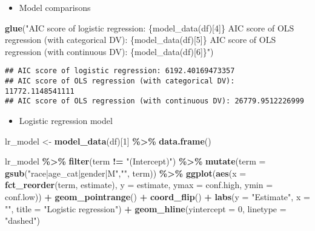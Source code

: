 \documentclass[
]{book}
\newenvironment{Shaded}{\begin{snugshade}}{\end{snugshade}}
\newcommand{\DataTypeTok}[1]{\textcolor[rgb]{0.13,0.29,0.53}{#1}}
\newcommand{\DecValTok}[1]{\textcolor[rgb]{0.00,0.00,0.81}{#1}}
\newcommand{\KeywordTok}[1]{\textcolor[rgb]{0.13,0.29,0.53}{\textbf{#1}}}
\newcommand{\NormalTok}[1]{#1}
\newcommand{\OperatorTok}[1]{\textcolor[rgb]{0.81,0.36,0.00}{\textbf{#1}}}
\newcommand{\StringTok}[1]{\textcolor[rgb]{0.31,0.60,0.02}{#1}}
\providecommand{\tightlist}{%
  \setlength{\itemsep}{0pt}\setlength{\parskip}{0pt}}
\begin{document}
\begin{itemize}
\tightlist
\item
  Model comparisons
\end{itemize}

\begin{Shaded}
\begin{Highlighting}[]
\KeywordTok{glue}\NormalTok{(}\StringTok{"AIC score of logistic regression: \{model\_data(df)[4]\} }
\StringTok{      AIC score of OLS regression (with categorical DV):  \{model\_data(df)[5]\}}
\StringTok{      AIC score of OLS regression (with continuous DV): \{model\_data(df)[6]\}"}\NormalTok{)}
\end{Highlighting}
\end{Shaded}

\begin{verbatim}
## AIC score of logistic regression: 6192.40169473357 
## AIC score of OLS regression (with categorical DV):  11772.1148541111
## AIC score of OLS regression (with continuous DV): 26779.9512226999
\end{verbatim}

\begin{itemize}
\tightlist
\item
  Logistic regression model
\end{itemize}

\begin{Shaded}
\begin{Highlighting}[]
\NormalTok{lr\_model \textless{}{-}}\StringTok{ }\KeywordTok{model\_data}\NormalTok{(df)[}\DecValTok{1}\NormalTok{] }\OperatorTok{\%\textgreater{}\%}\StringTok{ }\KeywordTok{data.frame}\NormalTok{()}

\NormalTok{lr\_model }\OperatorTok{\%\textgreater{}\%}
\StringTok{  }\KeywordTok{filter}\NormalTok{(term }\OperatorTok{!=}\StringTok{ "(Intercept)"}\NormalTok{) }\OperatorTok{\%\textgreater{}\%}
\StringTok{  }\KeywordTok{mutate}\NormalTok{(}\DataTypeTok{term =} \KeywordTok{gsub}\NormalTok{(}\StringTok{"race|age\_cat|gender|M"}\NormalTok{,}\StringTok{""}\NormalTok{, term)) }\OperatorTok{\%\textgreater{}\%}
\StringTok{  }\KeywordTok{ggplot}\NormalTok{(}\KeywordTok{aes}\NormalTok{(}\DataTypeTok{x =} \KeywordTok{fct\_reorder}\NormalTok{(term, estimate), }\DataTypeTok{y =}\NormalTok{ estimate, }\DataTypeTok{ymax =}\NormalTok{ conf.high, }\DataTypeTok{ymin =}\NormalTok{ conf.low)) }\OperatorTok{+}
\StringTok{  }\KeywordTok{geom\_pointrange}\NormalTok{() }\OperatorTok{+}
\StringTok{  }\KeywordTok{coord\_flip}\NormalTok{() }\OperatorTok{+}
\StringTok{  }\KeywordTok{labs}\NormalTok{(}\DataTypeTok{y =} \StringTok{"Estimate"}\NormalTok{, }\DataTypeTok{x =} \StringTok{""}\NormalTok{,}
      \DataTypeTok{title =} \StringTok{"Logistic regression"}\NormalTok{) }\OperatorTok{+}
\StringTok{  }\KeywordTok{geom\_hline}\NormalTok{(}\DataTypeTok{yintercept =} \DecValTok{0}\NormalTok{, }\DataTypeTok{linetype =} \StringTok{"dashed"}\NormalTok{)}
\end{Highlighting}
\end{Shaded}
\end{document}
